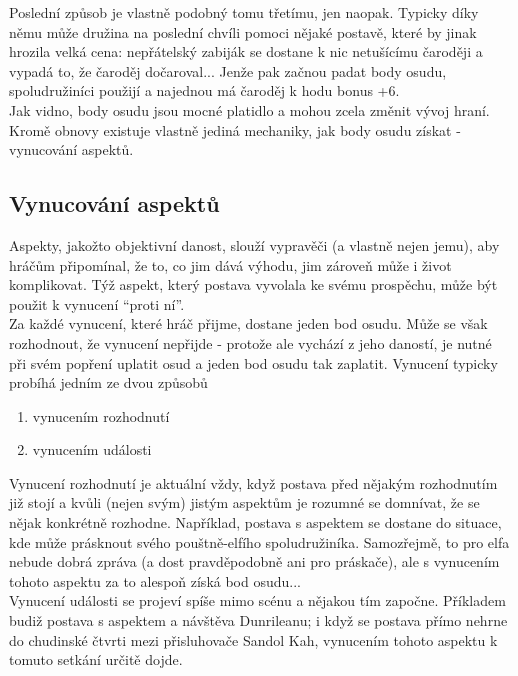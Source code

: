 \documentclass[../main.tex]{subfiles}
\begin{document}
Poslední způsob je vlastně podobný tomu třetímu, jen naopak. Typicky díky němu může družina na poslední chvíli pomoci nějaké postavě, které by jinak hrozila velká cena: nepřátelský zabiják se dostane k nic netušícímu čaroději a vypadá to, že čaroděj dočaroval... Jenže pak začnou padat body osudu, spoludružiníci použijí   a najednou má čaroděj k hodu bonus +6. \\

Jak vidno, body osudu jsou mocné platidlo a mohou zcela změnit vývoj hraní. Kromě obnovy existuje vlastně jediná mechaniky, jak body osudu získat - vynucování aspektů.

\subsection{Vynucování aspektů}
\label{sec:vynucovani-aspektu}

Aspekty, jakožto objektivní danost, slouží vypravěči (a vlastně nejen jemu), aby hráčům připomínal, že to, co jim dává výhodu, jim zároveň může i život komplikovat. Týž aspekt, který postava vyvolala ke svému prospěchu, může být použit k vynucení ``proti ní''.\\
Za každé vynucení, které hráč přijme, dostane jeden bod osudu. Může se však rozhodnout, že vynucení nepřijde - protože ale vychází z jeho daností, je nutné při svém popření uplatit osud a jeden bod osudu tak zaplatit. Vynucení typicky probíhá jedním ze dvou způsobů

\begin{enumerate}
\item vynucením rozhodnutí
\item vynucením události
\end{enumerate}

Vynucení rozhodnutí je aktuální vždy, když postava před nějakým rozhodnutím již stojí a kvůli (nejen svým) jistým aspektům je rozumné se domnívat, že se nějak konkrétně rozhodne. Například, postava s aspektem  se dostane do situace, kde může prásknout svého pouštně-elfího spoludružiníka. Samozřejmě, to pro elfa nebude dobrá zpráva (a dost pravděpodobně ani pro práskače), ale s vynucením tohoto aspektu za to alespoň získá bod osudu...\\
Vynucení události se projeví spíše mimo scénu a nějakou tím započne. Příkladem budiž postava s aspektem  a návštěva Dunrileanu; i když se postava přímo nehrne do chudinské čtvrti mezi přisluhovače Sandol Kah, vynucením tohoto aspektu k tomuto setkání určitě dojde.\\
\end{document}
